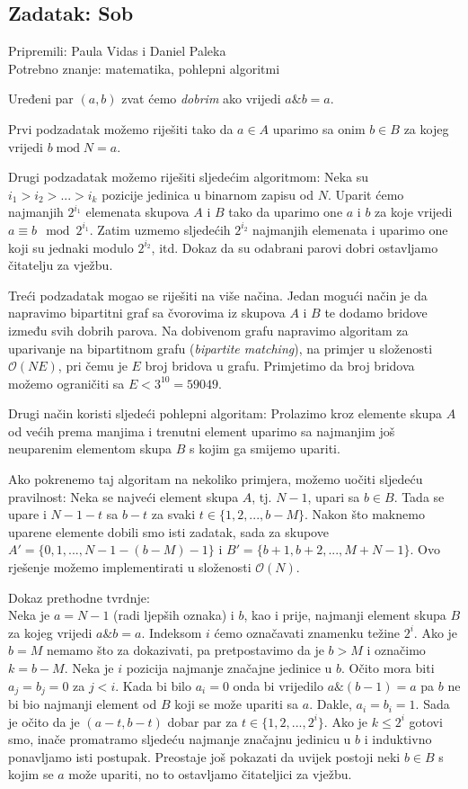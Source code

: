 \documentclass[a4paper]{article}
\begin{document}
\subsection*{Zadatak: Sob}
\textsf{Pripremili: Paula Vidas i Daniel Paleka}\\
\textsf{Potrebno znanje: matematika, pohlepni algoritmi}

Uređeni par $(a, b)$ zvat ćemo \emph{dobrim} ako vrijedi $a \mathbin\& b = a$.

Prvi podzadatak možemo riješiti tako da $a \in A$ uparimo sa onim $b \in B$ za
kojeg vrijedi $b \mathbin{\textrm{mod}} N = a$.

Drugi podzadatak možemo riješiti sljedećim algoritmom: Neka su
$i_1 > i_2 > ... > i_k$ pozicije jedinica u binarnom zapisu od $N$. Uparit ćemo
najmanjih $2^{i_1}$ elemenata skupova $A$ i $B$ tako da uparimo one $a$ i $b$
za koje vrijedi $a \equiv b \mod 2^{i_1}$. Zatim uzmemo sljedećih $2^{i_2}$
najmanjih elemenata i uparimo one koji su jednaki modulo $2^{i_2}$, itd.
Dokaz da su odabrani parovi dobri ostavljamo čitatelju za vježbu.

Treći podzadatak mogao se riješiti na više načina. Jedan mogući način je da
napravimo bipartitni graf sa čvorovima iz skupova $A$ i $B$ te dodamo bridove
između svih dobrih parova. Na dobivenom grafu napravimo algoritam za uparivanje
na bipartitnom grafu (\emph{bipartite matching}), na primjer u složenosti
$\mathcal{O}(NE)$, pri čemu je $E$ broj bridova u grafu.
Primjetimo da broj bridova možemo ograničiti sa $E < 3^{10} = 59049$.

Drugi način koristi sljedeći pohlepni algoritam: Prolazimo kroz elemente skupa
$A$ od većih prema manjima i trenutni element uparimo sa najmanjim još
neuparenim elementom skupa $B$ s kojim ga smijemo upariti.

Ako pokrenemo taj algoritam na nekoliko primjera, možemo uočiti sljedeću
pravilnost: Neka se najveći element skupa $A$, tj. $N - 1$, upari sa $b \in B$.
Tada se upare i $N - 1 - t$ sa $b - t$ za svaki $t \in \{1, 2, ..., b - M\}$.
Nakon što maknemo uparene elemente dobili smo isti zadatak, sada za skupove
$A' = \{0, 1, ..., N - 1 - (b - M) - 1\}$ i
$B' = \{b + 1, b + 2, ..., M + N - 1\}$. Ovo rješenje možemo implementirati u
složenosti $\mathcal{O}(N)$.

Dokaz prethodne tvrdnje:\\
Neka je $a = N - 1$ (radi ljepših oznaka) i $b$, kao i prije, najmanji element
skupa $B$ za kojeg vrijedi $a \mathbin\& b = a$. Indeksom $i$ ćemo označavati znamenku
težine $2^i$. Ako je $b = M$ nemamo što za dokazivati, pa pretpostavimo da je
$b > M$ i označimo $k = b - M$. Neka je $i$ pozicija najmanje značajne jedinice u $b$.
Očito mora biti $a_j = b_j = 0$ za $j < i$. Kada bi bilo $a_i = 0$ onda bi vrijedilo
$a \mathbin\& (b - 1) = a$ pa $b$ ne bi bio najmanji element od $B$ koji se može upariti
sa $a$. Dakle, $a_i = b_i = 1$. Sada je očito da je $(a - t, b - t)$ dobar par za
$t \in \{1, 2, ..., 2^i\}$. Ako je $k \leq 2^i$ gotovi smo, inače promatramo sljedeću
najmanje značajnu jedinicu u $b$ i induktivno ponavljamo isti postupak.
Preostaje još pokazati da uvijek postoji neki $b \in B$ s kojim se $a$ može upariti, no
to ostavljamo čitateljici za vježbu.
\end{document}
